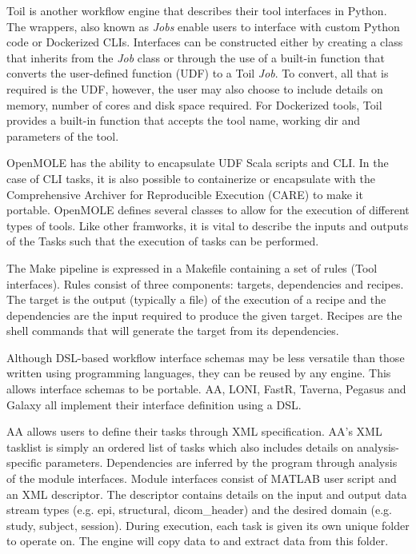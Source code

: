 \documentclass{report}
\begin{document}
            Toil is another workflow engine that describes their tool interfaces
            in Python. The wrappers, also known as \textit{Jobs} enable users to
            interface with custom Python code or Dockerized \cite{merkel2014docker} 
            CLIs. Interfaces can be constructed either by creating a class that
            inherits from the \textit{Job} class or through the use of a 
            built-in function that converts the user-defined function (UDF) to a 
            Toil \textit{Job}. To convert, all that is required is the UDF,
            however, the user may also choose to include details on memory, 
            number of cores and disk space required. For Dockerized tools, Toil
            provides a built-in function that accepts the tool name, working dir
            and parameters of the tool.

            OpenMOLE has the ability to encapsulate UDF Scala scripts and CLI. 
            In the case of CLI tasks, it is also possible to containerize or 
            encapsulate with the Comprehensive Archiver for Reproducible Execution (CARE) \cite{Janin:2014:CCA:2618137.2618138} to make it portable. OpenMOLE
            defines several classes to allow for the execution of different 
            types of tools. Like other framworks, it is vital to describe the
            inputs and outputs of the Tasks such that the execution of tasks 
            can be performed. 

            The Make pipeline is expressed in a Makefile containing a set of 
            rules (Tool interfaces). Rules consist of three components: targets, 
            dependencies and recipes. The target is the output (typically a 
            file) of the 
            execution of a recipe and the dependencies are the input required to 
            produce the given target. Recipes are the shell commands that will
            generate the target from its dependencies. 

            Although DSL-based workflow interface schemas may be less versatile
            than those written using programming languages, they
            can be reused by any engine. This allows interface schemas to be 
            portable. AA, LONI, FastR, Taverna, Pegasus and Galaxy all 
            implement their interface definition using a DSL.

            AA 
            allows users to define their tasks through XML specification. AA's 
            XML tasklist is simply an ordered list of tasks which also includes
            details on analysis-specific parameters. Dependencies are
            inferred by the program through analysis of the module interfaces.
            Module interfaces consist of MATLAB user script and an XML 
            descriptor. The descriptor contains details on the input and output
            data stream types (e.g. epi, structural, dicom\_header) 
            and the desired domain (e.g. study, subject, session). During 
            execution, each task is given its own unique folder to operate on. 
            The engine will copy data to and extract data from this folder.
\end{document}
